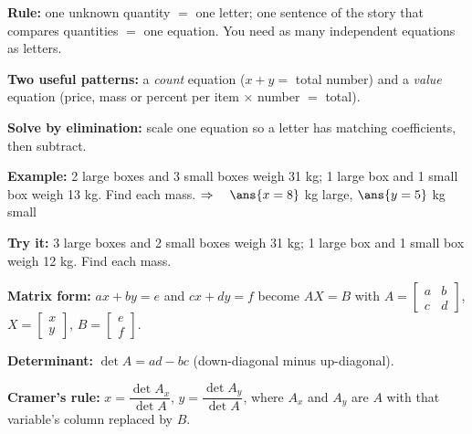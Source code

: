 \documentclass[12pt]{article}
\begin{document}


\begin{formulabox}
\textbf{Rule:} one unknown quantity $=$ one letter; one sentence of the story that
compares quantities $=$ one equation. You need as many independent equations as letters.\par
\textbf{Two useful patterns:} a \emph{count} equation ($x + y = $ total number) and a
\emph{value} equation (price, mass or percent per item $\times$ number $=$ total).\par
\textbf{Solve by elimination:} scale one equation so a letter has matching coefficients, then subtract.
\end{formulabox}

\begin{examplebox}
\textbf{Example:} 2 large boxes and 3 small boxes weigh 31 kg; 1 large box and 1 small
box weigh 13 kg. Find each mass.
$\Rightarrow\quad \ans{x = 8}$ kg large, $\ans{y = 5}$ kg small
\end{examplebox}

\begin{tryitbox}
\textbf{Try it:} 3 large boxes and 2 small boxes weigh 31 kg; 1 large box and 1 small
box weigh 12 kg. Find each mass.\\[2pt]
\end{tryitbox}


\begin{formulabox}
\textbf{Matrix form:} $ax + by = e$ and $cx + dy = f$ become $AX = B$ with
$A = \begin{bmatrix} a & b \\ c & d \end{bmatrix}$,
$X = \begin{bmatrix} x \\ y \end{bmatrix}$,
$B = \begin{bmatrix} e \\ f \end{bmatrix}$.\par
\textbf{Determinant:} $\det A = ad - bc$ (down-diagonal minus up-diagonal).\par
\textbf{Cramer's rule:} $x = \dfrac{\det A_x}{\det A}$, $y = \dfrac{\det A_y}{\det A}$, where
$A_x$ and $A_y$ are $A$ with that variable's column replaced by $B$.
\end{formulabox}
\end{document}

